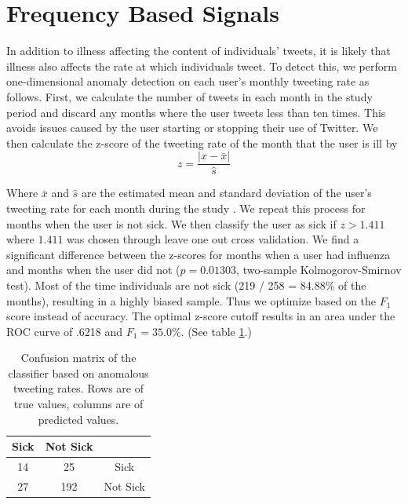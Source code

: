 \section{Frequency Based Signals}

In addition to illness affecting the content of individuals' tweets, it is likely that illness also affects the rate at which individuals tweet. To detect this, we perform one-dimensional anomaly detection on each user's monthly tweeting rate as follows. First, we calculate the number of tweets in each month in the study period and discard any months where the user tweets less than ten times. This avoids issues caused by the user starting or stopping their use of Twitter. We then calculate the z-score of the tweeting rate of the month that the user is ill by
\begin{equation}
z = \frac{|x - \bar{x}|}{\hat{s}}
\end{equation}

Where \(\bar{x}\) and \(\hat{s}\) are the estimated mean and standard deviation of the user's tweeting rate for each month during the study \cite{Grubs:1969ab}. We repeat this process for months when the user is not sick. We then classify the user as sick if \(z > 1.411\) where \(1.411\) was chosen through leave one out cross validation. We find a significant difference between the z-scores for months when a user had influenza and months when the user did not (\(p = 0.01303\), two-sample Kolmogorov-Smirnov test). Most of the time individuals are not sick (219 / 258 = 84.88\% of the months), resulting in a highly biased sample. Thus we optimize based on the \(F_1\) score instead of accuracy. The optimal z-score cutoff results in  an area under the ROC curve of .6218 and \(F_1= 35.0\%\). (See table \ref{tab:tweet_anomaly_confusion}.) 


\begin{table}[h]
\centering
\begin{tabular}{|c|c|c|} \hline
Sick&Not Sick&\ \\ \hline
14 & 25 & Sick\\ \hline
27 & 192 & Not Sick\\
\hline\end{tabular}
\caption{Confusion matrix of the classifier based on anomalous tweeting rates. Rows are of true values, columns are of predicted values.}
\label{tab:tweet_anomaly_confusion}
\end{table}

